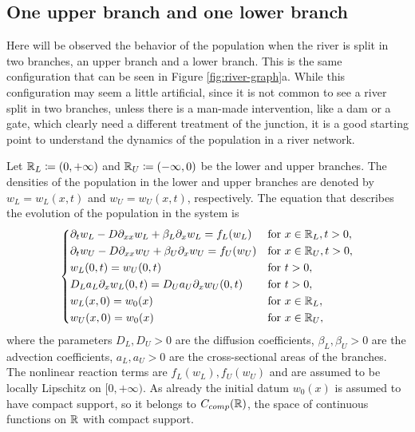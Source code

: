 \subsection{One upper branch and one lower branch}

Here will be observed the behavior of the population when the river is split in two branches, an upper branch and a lower branch. This is the same configuration that can be seen in Figure \ref{fig:river-graph}a. While this configuration may seem a little artificial, since it is not common to see a river split in two branches, unless there is a man-made intervention, like a dam or a gate, which clearly need a different treatment of the junction, it is a good starting point to understand the dynamics of the population in a river network.

Let \(\mathbb{R}_L \coloneqq (0, +\infty)\) and \(\mathbb{R}_U \coloneqq (-\infty, 0)\) be the lower and upper branches. The densities of the population in the lower and upper branches are denoted by \(w_L = w_L(x, t)\) and \(w_U = w_U(x, t)\), respectively. The equation that describes the evolution of the population in the system is
\begin{equation}
    \begin{dcases}
        \partial_t w_L - D \partial_{xx}w_L + \beta_L \partial_x w_L = f_L(w_L) & \text{for } x \in \mathbb{R}_L, t > 0, \\
        \partial_t w_U - D \partial_{xx}w_U + \beta_U \partial_x w_U = f_U(w_U) & \text{for } x \in \mathbb{R}_U, t > 0, \\
        w_L(0, t) = w_U(0, t) & \text{for } t > 0, \\
        D_L a_L \partial_x w_L(0, t) = D_U a_U \partial_x w_U(0, t) & \text{for } t > 0, \\
        w_L(x, 0) = w_{0}(x) & \text{for } x \in \mathbb{R}_L, \\
        w_U(x, 0) = w_{0}(x) & \text{for } x \in \mathbb{R}_U,
    \end{dcases}
    \label{eq:1.4}
\end{equation}
where the parameters \(D_L, D_U > 0\) are the diffusion coefficients, \(\beta_L, \beta_U > 0\) are the advection coefficients, \(a_L, a_U > 0\) are the cross-sectional areas of the branches. The nonlinear reaction terms are \(f_L(w_L), f_U(w_U)\) and are assumed to be locally Lipschitz on \([0, +\infty)\). As already the initial datum \(w_0(x)\) is assumed to have compact support, so it belongs to \(C_{comp}(\mathbb{R})\), the space of continuous functions on \(\mathbb{R}\) with compact support.


